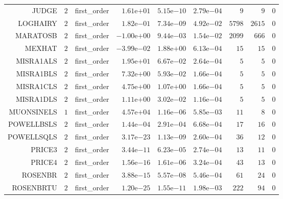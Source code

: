 \begin{longtable}{rrrrrrrrr}
JUDGE & \(     2\) & first\_order & \( 1.61\)e\(+01\) & \( 5.15\)e\(-10\) & \( 2.79\)e\(-04\) & \(     9\) & \(     9\) & \(     0\) \\
LOGHAIRY & \(     2\) & first\_order & \( 1.82\)e\(-01\) & \( 7.34\)e\(-09\) & \( 4.92\)e\(-02\) & \(  5798\) & \(  2615\) & \(     0\) \\
MARATOSB & \(     2\) & first\_order & \(-1.00\)e\(+00\) & \( 9.44\)e\(-03\) & \( 1.54\)e\(-02\) & \(  2099\) & \(   666\) & \(     0\) \\
MEXHAT & \(     2\) & first\_order & \(-3.99\)e\(-02\) & \( 1.88\)e\(+00\) & \( 6.13\)e\(-04\) & \(    15\) & \(    15\) & \(     0\) \\
MISRA1ALS & \(     2\) & first\_order & \( 1.95\)e\(+01\) & \( 6.67\)e\(-02\) & \( 2.64\)e\(-04\) & \(     5\) & \(     5\) & \(     0\) \\
MISRA1BLS & \(     2\) & first\_order & \( 7.32\)e\(+00\) & \( 5.93\)e\(-02\) & \( 1.66\)e\(-04\) & \(     5\) & \(     5\) & \(     0\) \\
MISRA1CLS & \(     2\) & first\_order & \( 4.75\)e\(+00\) & \( 1.07\)e\(+00\) & \( 1.66\)e\(-04\) & \(     5\) & \(     5\) & \(     0\) \\
MISRA1DLS & \(     2\) & first\_order & \( 1.11\)e\(+00\) & \( 3.02\)e\(-02\) & \( 1.16\)e\(-04\) & \(     5\) & \(     5\) & \(     0\) \\
MUONSINELS & \(     1\) & first\_order & \( 4.57\)e\(+04\) & \( 1.16\)e\(-06\) & \( 5.85\)e\(-03\) & \(    11\) & \(     8\) & \(     0\) \\
POWELLBSLS & \(     2\) & first\_order & \( 1.44\)e\(-04\) & \( 2.91\)e\(-04\) & \( 6.68\)e\(-04\) & \(    17\) & \(    16\) & \(     0\) \\
POWELLSQLS & \(     2\) & first\_order & \( 3.17\)e\(-23\) & \( 1.13\)e\(-09\) & \( 2.60\)e\(-04\) & \(    36\) & \(    12\) & \(     0\) \\
PRICE3 & \(     2\) & first\_order & \( 3.44\)e\(-11\) & \( 6.23\)e\(-05\) & \( 2.74\)e\(-04\) & \(    13\) & \(    11\) & \(     0\) \\
PRICE4 & \(     2\) & first\_order & \( 1.56\)e\(-16\) & \( 1.61\)e\(-06\) & \( 3.24\)e\(-04\) & \(    43\) & \(    13\) & \(     0\) \\
ROSENBR & \(     2\) & first\_order & \( 3.88\)e\(-15\) & \( 5.57\)e\(-08\) & \( 5.46\)e\(-04\) & \(    61\) & \(    24\) & \(     0\) \\
ROSENBRTU & \(     2\) & first\_order & \( 1.20\)e\(-25\) & \( 1.55\)e\(-11\) & \( 1.98\)e\(-03\) & \(   222\) & \(    94\) & \(     0\) \\

\end{longtable}
